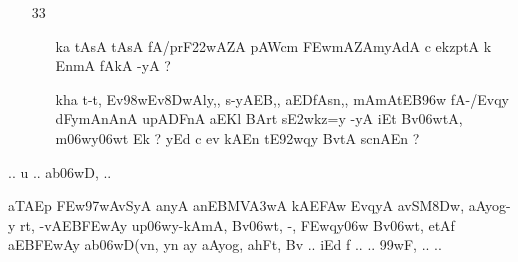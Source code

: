 \def\DevnagVersion{2.15}\documentclass{article}
\begin{document}
\begin{itemize}
\begin{itemize}
               \item[\dn ~na] {\dn EC/`vE\306wt{\rs -\re}En,SkA@yynAEdk aASy\2 BvtA\2 \3FEwd\?f\? upl<y{\rs -\re}mAn\2 Bv\306wmtAsAr\?Z pyA\0\3D8w\2 n {\rs ?\re}}
                             
               \end{itemize}
               
  \item[33] \begin{itemize}
  
            \item[\dn ka] {\dn tAsA\2 tAsA\2 fA/\0prF\322wAZA\2 pAWcm\? \3FEwmAZAmyA\0dA c ekzptA k\2 EnmA\0\2 fAkA -yA {\rs ?\re}}
            
            \item[\dn kha] {\dn t\4-t\4, Ev\398wEv\38DwAly\4,{\rs ,\re} s\2-yAEB,{\rs ,\re} aEDfAsn\4,{\rs ,\re} mAmAtEB\396w fA-/Evqy\? dFymAnAnA upADFnA aEKl\? BArt\? s\3E2wkz=y\2 -yA iEt Bv\306wtA, m\306wy\306wt\? Ek {\rs ?\re} yEd c ev kAEn tE\392wqy\? BvtA\2 s\2cnAEn {\rs ?\re} }
  
            \end{itemize}                                           
\end{itemize}

\begin{center}
{\dn .. u .. ab\306wD, ..}
\end{center}

{\dn aTAEp \3FEw\397wAvSyA anyA anEBMV\3A3wA kAE\3FAw EvqyA avSM\38Dw{\rs ,\re} aAyog-y rt, -vAEB\3FEwAy up\306wy-kAmA, Bv\306wt, -, \3FEw\?qy\306w Bv\306wt, etAf aEB\3FEwAy ab\306wD(v\?n{\rs ,\re} y\?n ay aAyog, a\5hFt, Bv\? .. iEd f .. {\rs *\re} .. \399wF, .. {\rs *\re} ..}
\end{document}
